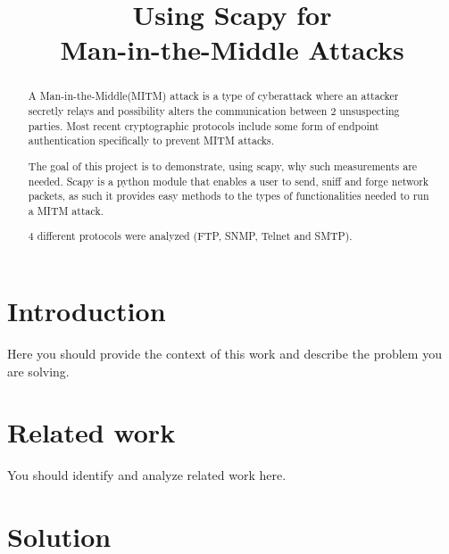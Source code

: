 \documentclass[conference]{IEEEtran}
\begin{document}
\title{Using Scapy for \\ Man-in-the-Middle Attacks}

\author{
    \and
}

\maketitle

\begin{abstract}
    A Man-in-the-Middle(MITM) attack is a type of cyberattack where an attacker
    secretly relays and possibility alters the communication between 2 
    unsuspecting parties.
    Most recent cryptographic protocols include some form of endpoint 
    authentication specifically to prevent MITM attacks. 
    
    The goal of this project is to demonstrate, using scapy, why such 
    measurements are needed.
    Scapy is a python module that enables a user to send, sniff and forge 
    network packets, as such it provides easy methods to the types of 
    functionalities needed to run a MITM attack.
    
    4 different protocols were analyzed (FTP, SNMP, Telnet and SMTP).


\end{abstract}


\section{Introduction}

Here you should provide the context of this work and describe the problem you are solving. 

\section{Related work}
You should identify and analyze related work here. 

\section{Solution}
\end{document}
